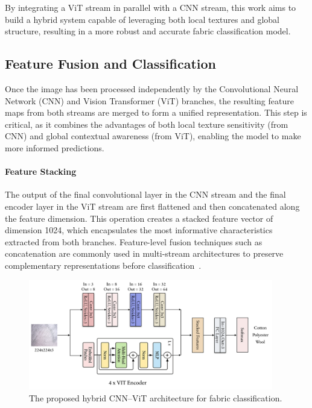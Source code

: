 By integrating a ViT stream in parallel with a CNN stream, this work aims to build a hybrid system capable of leveraging both local textures and global structure, resulting in a more robust and accurate fabric classification model.

\subsection{Feature Fusion and Classification}

Once the image has been processed independently by the Convolutional Neural Network (CNN) and Vision Transformer (ViT) branches, the resulting feature maps from both streams are merged to form a unified representation. This step is critical, as it combines the advantages of both local texture sensitivity (from CNN) and global contextual awareness (from ViT), enabling the model to make more informed predictions.

\paragraph{Feature Stacking}

The output of the final convolutional layer in the CNN stream and the final encoder layer in the ViT stream are first flattened and then concatenated along the feature dimension. This operation creates a stacked feature vector of dimension 1024, which encapsulates the most informative characteristics extracted from both branches. Feature-level fusion techniques such as concatenation are commonly used in multi-stream architectures to preserve complementary representations before classification~\cite{zhong2023textilenet, chitra2023fabric, xu2018multichannel}.

\begin{figure}[ht]
    \centering
    \includegraphics[width=0.95\textwidth]{images/ModelDiagram.png}
    \caption{The proposed hybrid CNN–ViT architecture for fabric classification.}
    \label{fig:model-architecture}
\end{figure}

